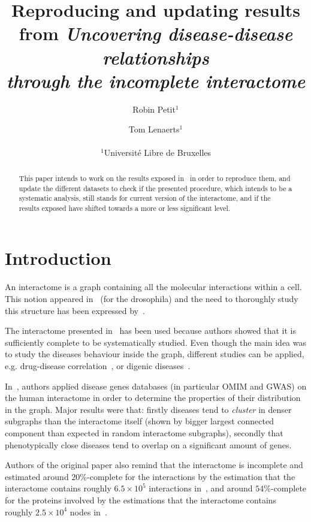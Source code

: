 \documentclass[letterpaper]{article}
\title{Reproducing and updating results from
\textit{Uncovering disease-disease relationships\\through the incomplete interactome}}
\author{Robin Petit$^{1}$ \and Tom Lenaerts$^{1}$\\
\mbox{}\\
$^1$Université Libre de Bruxelles}
\begin{document}
\maketitle

\begin{abstract}
  This paper intends to work on the results exposed in~\cite{originalPaper} in order to
	reproduce them, and update the different datasets to check if the presented procedure,
	which intends to be a systematic analysis, still stands for current version of the
	interactome, and if the results exposed have shifted towards a more or less significant
	level.
\end{abstract}

\section{Introduction}
An interactome is a graph containing all the molecular interactions within a cell. This notion appeared
in~\cite{sanchez1999grasping} (for the drosophila) and the need to thoroughly study this structure has
been expressed by~\cite{UnderstandingTheCellFunctionalOrganization}.

The interactome presented in~\cite{originalPaper} has been used because authors showed that it is
sufficiently complete to be systematically studied. Even though the main idea was to study the diseases
behaviour inside the graph, different studies can be applied, e.g. drug-disease correlation~\cite{Yu2016extraction},
or digenic diseases~\cite{gazzo2015dida}.

In~\cite{originalPaper}, authors applied disease genes databases (in particular OMIM and GWAS) on
the human interactome in order to determine the properties of their distribution in the graph.
Major results were that: firstly diseases tend to \textit{cluster} in denser subgraphs than the
interactome itself (shown by bigger largest connected component than expected in random interactome subgraphs),
secondly that phenotypically close diseases tend to overlap on a significant amount of genes.

Authors of the original paper also remind that the interactome is incomplete and estimated around $20\%$-complete
for the interactions by the estimation that the interactome contains roughly $6.5 \times 10^5$ interactions
in~\cite{estimatingTheSizeOfTheHumanInteractome}, and around $54\%$-complete for the proteins involved by the
estimations that the interactome contains roughly $2.5 \times 10^4$ nodes in~\cite{ATruerMeasureOfOurIgnorance}.
\end{document}
